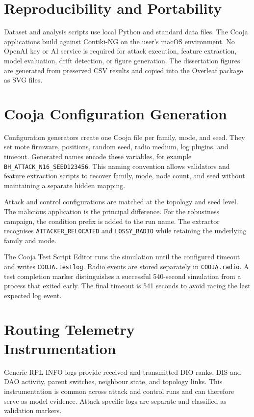 \section{Reproducibility and Portability}

Dataset and analysis scripts use local Python and standard data files. The Cooja applications build against Contiki-NG on the user's macOS environment. No OpenAI key or AI service is required for attack execution, feature extraction, model evaluation, drift detection, or figure generation. The dissertation figures are generated from preserved CSV results and copied into the Overleaf package as SVG files.

\section{Cooja Configuration Generation}

Configuration generators create one Cooja file per family, mode, and seed. They set mote firmware, positions, random seed, radio medium, log plugins, and timeout. Generated names encode these variables, for example \texttt{BH\_ATTACK\_N16\_SEED123456}. This naming convention allows validators and feature extraction scripts to recover family, mode, node count, and seed without maintaining a separate hidden mapping.

Attack and control configurations are matched at the topology and seed level. The malicious application is the principal difference. For the robustness campaign, the condition prefix is added to the run name. The extractor recognises \texttt{ATTACKER\_RELOCATED} and \texttt{LOSSY\_RADIO} while retaining the underlying family and mode.

The Cooja Test Script Editor runs the simulation until the configured timeout and writes \texttt{COOJA.testlog}. Radio events are stored separately in \texttt{COOJA.radio}. A test completion marker distinguishes a successful 540-second simulation from a process that exited early. The final timeout is 541 seconds to avoid racing the last expected log event.

\section{Routing Telemetry Instrumentation}

Generic RPL INFO logs provide received and transmitted DIO ranks, DIS and DAO activity, parent switches, neighbour state, and topology links. This instrumentation is common across attack and control runs and can therefore serve as model evidence. Attack-specific logs are separate and classified as validation markers.

